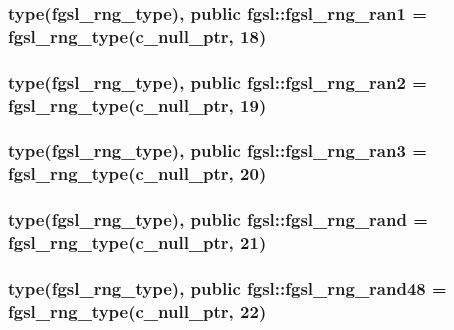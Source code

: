 \hypertarget{classfgsl_a4b91ddd8f42db11c9ae467f1b8fbe5f2}{
\subsubsection[{fgsl\-\_\-rng\-\_\-ran1}]{\setlength{\rightskip}{0pt plus 5cm}type({\bf fgsl\-\_\-rng\-\_\-type}), public fgsl\-::fgsl\-\_\-rng\-\_\-ran1 = {\bf fgsl\-\_\-rng\-\_\-type}(c\-\_\-null\-\_\-ptr, 18)}}\label{classfgsl_a4b91ddd8f42db11c9ae467f1b8fbe5f2}
\hypertarget{classfgsl_a82dd93da12a619eb5cbf8a4d32e44daa}{
\subsubsection[{fgsl\-\_\-rng\-\_\-ran2}]{\setlength{\rightskip}{0pt plus 5cm}type({\bf fgsl\-\_\-rng\-\_\-type}), public fgsl\-::fgsl\-\_\-rng\-\_\-ran2 = {\bf fgsl\-\_\-rng\-\_\-type}(c\-\_\-null\-\_\-ptr, 19)}}\label{classfgsl_a82dd93da12a619eb5cbf8a4d32e44daa}
\hypertarget{classfgsl_a2bcafc9c66a493e0ad7ead60bf9d9a0e}{
\subsubsection[{fgsl\-\_\-rng\-\_\-ran3}]{\setlength{\rightskip}{0pt plus 5cm}type({\bf fgsl\-\_\-rng\-\_\-type}), public fgsl\-::fgsl\-\_\-rng\-\_\-ran3 = {\bf fgsl\-\_\-rng\-\_\-type}(c\-\_\-null\-\_\-ptr, 20)}}\label{classfgsl_a2bcafc9c66a493e0ad7ead60bf9d9a0e}
\hypertarget{classfgsl_afbedce588830713e9a4f2dfdebe1a262}{
\subsubsection[{fgsl\-\_\-rng\-\_\-rand}]{\setlength{\rightskip}{0pt plus 5cm}type({\bf fgsl\-\_\-rng\-\_\-type}), public fgsl\-::fgsl\-\_\-rng\-\_\-rand = {\bf fgsl\-\_\-rng\-\_\-type}(c\-\_\-null\-\_\-ptr, 21)}}\label{classfgsl_afbedce588830713e9a4f2dfdebe1a262}
\hypertarget{classfgsl_ae82ea40ab1281a4f6390dc0fd2ba998b}{
\subsubsection[{fgsl\-\_\-rng\-\_\-rand48}]{\setlength{\rightskip}{0pt plus 5cm}type({\bf fgsl\-\_\-rng\-\_\-type}), public fgsl\-::fgsl\-\_\-rng\-\_\-rand48 = {\bf fgsl\-\_\-rng\-\_\-type}(c\-\_\-null\-\_\-ptr, 22)}}\label{classfgsl_ae82ea40ab1281a4f6390dc0fd2ba998b}
